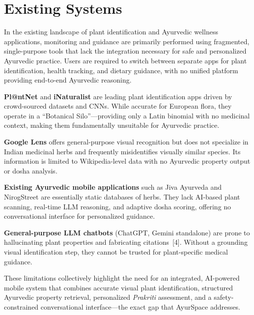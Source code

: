 \newpage
\section{Existing Systems}
\justify
In the existing landscape of plant identification and Ayurvedic wellness applications,
monitoring and guidance are primarily performed using fragmented, single-purpose tools
that lack the integration necessary for safe and personalized Ayurvedic practice. Users
are required to switch between separate apps for plant identification, health tracking,
and dietary guidance, with no unified platform providing end-to-end Ayurvedic reasoning.

\textbf{Pl@ntNet} and \textbf{iNaturalist} are leading plant identification apps driven
by crowd-sourced datasets and CNNs. While accurate for European flora, they operate in
a ``Botanical Silo''---providing only a Latin binomial with no medicinal context,
making them fundamentally unsuitable for Ayurvedic practice.

\textbf{Google Lens} offers general-purpose visual recognition but does not specialize
in Indian medicinal herbs and frequently misidentifies visually similar species. Its
information is limited to Wikipedia-level data with no Ayurvedic property output or
dosha analysis.

\textbf{Existing Ayurvedic mobile applications} such as Jiva Ayurveda and NirogStreet
are essentially static databases of herbs. They lack AI-based plant scanning, real-time
LLM reasoning, and adaptive dosha scoring, offering no conversational interface for
personalized guidance.

\textbf{General-purpose LLM chatbots} (ChatGPT, Gemini standalone) are prone to
hallucinating plant properties and fabricating citations~[4]. Without a grounding
visual identification step, they cannot be trusted for plant-specific medical guidance.

These limitations collectively highlight the need for an integrated, AI-powered mobile
system that combines accurate visual plant identification, structured Ayurvedic property
retrieval, personalized \textit{Prakriti} assessment, and a safety-constrained
conversational interface---the exact gap that AyurSpace addresses.

\newpage
